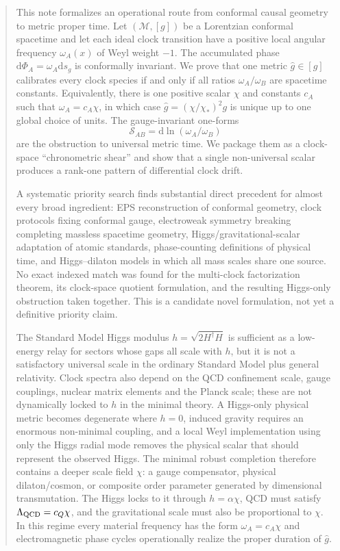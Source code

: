 \documentclass[11pt,a4paper]{article}
\newcommand{\dd}{\mathrm{d}}
\newcommand{\M}{\mathcal{M}}
\begin{document}

\begin{abstract}
This note formalizes an operational route from conformal causal geometry to metric proper time. Let $(\M,[g])$ be a Lorentzian conformal spacetime and let each ideal clock transition have a positive local angular frequency $\omega_A(x)$ of Weyl weight $-1$. The accumulated phase $\dd\Phi_A=\omega_A\dd s_g$ is conformally invariant. We prove that one metric $\widehat g\in[g]$ calibrates every clock species if and only if all ratios $\omega_A/\omega_B$ are spacetime constants. Equivalently, there is one positive scalar $\chi$ and constants $c_A$ such that $\omega_A=c_A\chi$, in which case $\widehat g=(\chi/\chi_*)^2g$ is unique up to one global choice of units. The gauge-invariant one-forms
\[
 \mathcal S_{AB}=\dd\ln(\omega_A/\omega_B)
\]
are the obstruction to universal metric time. We package them as a clock-space ``chronometric shear'' and show that a single non-universal scalar produces a rank-one pattern of differential clock drift.

A systematic priority search finds substantial direct precedent for almost every broad ingredient: EPS reconstruction of conformal geometry, clock protocols fixing conformal gauge, electroweak symmetry breaking completing massless spacetime geometry, Higgs/gravitational-scalar adaptation of atomic standards, phase-counting definitions of physical time, and Higgs--dilaton models in which all mass scales share one source. No exact indexed match was found for the multi-clock factorization theorem, its clock-space quotient formulation, and the resulting Higgs-only obstruction taken together. This is a candidate novel formulation, not yet a definitive priority claim.

The Standard Model Higgs modulus $h=\sqrt{2H^\dagger H}$ is sufficient as a low-energy relay for sectors whose gaps all scale with $h$, but it is not a satisfactory universal scale in the ordinary Standard Model plus general relativity. Clock spectra also depend on the QCD confinement scale, gauge couplings, nuclear matrix elements and the Planck scale; these are not dynamically locked to $h$ in the minimal theory. A Higgs-only physical metric becomes degenerate where $h=0$, induced gravity requires an enormous non-minimal coupling, and a local Weyl implementation using only the Higgs radial mode removes the physical scalar that should represent the observed Higgs. The minimal robust completion therefore contains a deeper scale field $\chi$: a gauge compensator, physical dilaton/cosmon, or composite order parameter generated by dimensional transmutation. The Higgs locks to it through $h=\alpha\chi$, QCD must satisfy $\Lambda_{\rm QCD}=c_Q\chi$, and the gravitational scale must also be proportional to $\chi$. In this regime every material frequency has the form $\omega_A=c_A\chi$ and electromagnetic phase cycles operationally realize the proper duration of $\widehat g$.
\end{abstract}
\end{document}
